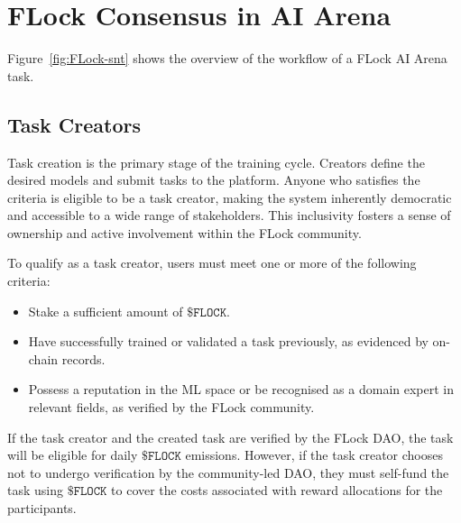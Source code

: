 \documentclass[conference]{IEEEtran}
\newcommand{\SNT}{{AI Arena}\xspace}
\newcommand{\FML}{\ensuremath{\xspace\texttt{\$FLOCK}}\xspace}
\begin{document}






\section{FLock Consensus in \SNT }


Figure~\ref{fig:FLock-snt} shows the overview of the workflow of a FLock \SNT task.

\subsection{Task Creators}

Task creation is the primary stage of the training cycle. Creators define the desired models and submit tasks to the platform. Anyone who satisfies the criteria is eligible to be a task creator, making the system inherently democratic and accessible to a wide range of stakeholders. This inclusivity fosters a sense of ownership and active involvement within the FLock community.

To qualify as a task creator, users must meet one or more of the following criteria:

\begin{itemize}
    \item Stake a sufficient amount of \FML.

    \item Have successfully trained or validated a task previously, as evidenced by on-chain records.
    
    \item Possess a reputation in the ML space or be recognised as a domain expert in relevant fields, as verified by the FLock community.
\end{itemize}

If the task creator and the created task are verified by the FLock DAO, the task will be eligible for daily \FML emissions. However, if the task creator chooses not to undergo verification by the community-led DAO, they must self-fund the task using \FML to cover the costs associated with reward allocations for the participants.
\end{document}
